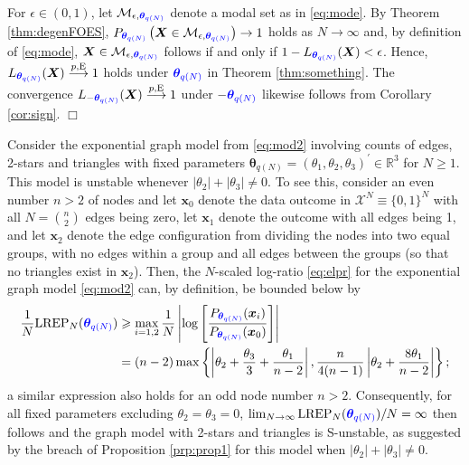 \documentclass[numbib]{imamat}
\theoremstyle{theorem}
\theoremstyle{lemma}
\theoremstyle{example}
\theoremstyle{corollary}
\theoremstyle{definition}
\theoremstyle{remark}
\theoremstyle{approximation}
\theoremstyle{scheme}
\newcommand{\REP}{\mathrm{LREP}}
\newcommand{\thetaidx}{q(N)}
\newcommand{\thetaN}{\boldsymbol \theta_{\thetaidx}}
\newcommand{\ak}[1]{{\color{blue} #1}}
\let\BeginKnitrBlock\begin \let\EndKnitrBlock\end
\begin{document}
For \(\epsilon \in(0,1)\), let \(\mathcal{M}_{\epsilon, \ak{\thetaN}}\) denote a modal set as in \eqref{eq:mode}. By Theorem \ref{thm:degenFOES}, \(P_{\ak{\thetaN}}\left( \boldsymbol X\in \mathcal{M}_{\epsilon, \ak{\thetaN}}\right) \rightarrow 1\) holds as \(N \rightarrow \infty\) and, by definition of \eqref{eq:mode}, \(\boldsymbol X\in \mathcal{M}_{\epsilon, \ak{\thetaN}}\) follows if and only if
\(1-L_{\ak{\thetaN}}(\boldsymbol X)<\epsilon\). Hence, \(L_{\ak{\thetaN}}(\boldsymbol X) \stackrel{p,\mathrm{E}}{\longrightarrow} 1\) holds under \(\ak{\thetaN}\) in Theorem \ref{thm:something}. The convergence \(L_{-\ak{\thetaN}}(\boldsymbol X) \stackrel{p,\mathrm{E}}{\longrightarrow} 1\) under \(-\ak{\thetaN}\) likewise follows from Corollary \ref{cor:sign}. \hfill \(\Box\)

\BeginKnitrBlock{remark}
\iffalse{} {Remark. } \fi{}Consider the exponential graph model from \eqref{eq:mod2} involving counts of edges, 2-stars and triangles with fixed parameters \(\thetaN = (\theta_{1},\theta_2,\theta_3)^\prime \in \mathbb{R}^3\) for \(N\geq 1\). This model is unstable whenever \(|\theta_2| + |\theta_3| \neq 0\). To see this, consider an even number \(n>2\) of nodes and let \(\boldsymbol x_0\) denote the data outcome in \(\mathcal{X}^N \equiv \{0,1\}^N\) with all \(N = {n \choose 2}\) edges being zero, let \(\boldsymbol x_1\) denote the outcome with all edges being 1, and let \(\boldsymbol x_2\) denote the edge configuration from dividing the nodes into two equal groups, with no edges within a group and all edges between the groups (so that no triangles exist in \(\boldsymbol x_2\)). Then, the \(N\)-scaled log-ratio \eqref{eq:elpr} for the exponential graph model \eqref{eq:mod2} can, by definition, be bounded below by
\begin{align*}
\frac{1}{N}\REP_N(\ak{\thetaN}) &\geq \max_{i=1,2}\frac{1}{N}
\left| \log\left[ \frac{P_{\ak{\thetaN}}(\boldsymbol x_i)}{P_{\ak{\thetaN}}(\boldsymbol x_0)}\right] \right| \\
&= (n-2) \max\left\{ \left| \theta_2 + \frac{\theta_3}{3}+\frac{\theta_1}{n-2} \right|, \frac{n}{4(n-1)} \left| \theta_2 + \frac{8\theta_1}{n-2} \right| \right\};
\end{align*}
a similar expression also holds for an odd node number \(n>2\). Consequently, for all fixed parameters excluding \(\theta_2=\theta_3=0\), \(\lim_{N\to \infty}\REP_N(\ak{\thetaN})/N=\infty\) then follows and the graph model with 2-stars and triangles is S-unstable, as suggested by the breach of Proposition \ref{prp:prop1} for this model when \(|\theta_2|+|\theta_3|\neq 0\).
\EndKnitrBlock{remark}
\end{document}
